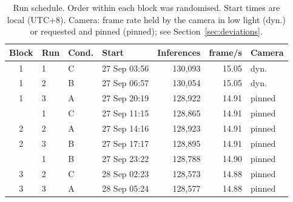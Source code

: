 \begin{table}[t]
\centering
\caption{Run schedule. Order within each block was randomised. Start times are local (UTC+8). Camera: frame rate held by the camera in low light (dyn.) or requested and pinned (pinned); see Section~\ref{sec:deviations}.}
\label{tab:runs}
\footnotesize
\setlength{\tabcolsep}{4pt}
\begin{tabular}{clllrrl}
\toprule
Block & Run & Cond. & Start & Inferences & frame/s & Camera\\
\midrule
1 & 1 & C & 27 Sep 03:56 & 130{,}093 & 15.05 & dyn.\\
1 & 2 & B & 27 Sep 06:57 & 130{,}054 & 15.05 & dyn.\\
1 & 3 & A & 27 Sep 20:19 & 128{,}922 & 14.91 & pinned\\
\addlinespace
2 & 1 & C & 27 Sep 11:15 & 128{,}865 & 14.91 & pinned\\
2 & 2 & A & 27 Sep 14:16 & 128{,}923 & 14.91 & pinned\\
2 & 3 & B & 27 Sep 17:17 & 128{,}895 & 14.91 & pinned\\
\addlinespace
3 & 1 & B & 27 Sep 23:22 & 128{,}788 & 14.90 & pinned\\
3 & 2 & C & 28 Sep 02:23 & 128{,}573 & 14.88 & pinned\\
3 & 3 & A & 28 Sep 05:24 & 128{,}577 & 14.88 & pinned\\
\bottomrule
\end{tabular}
\end{table}
